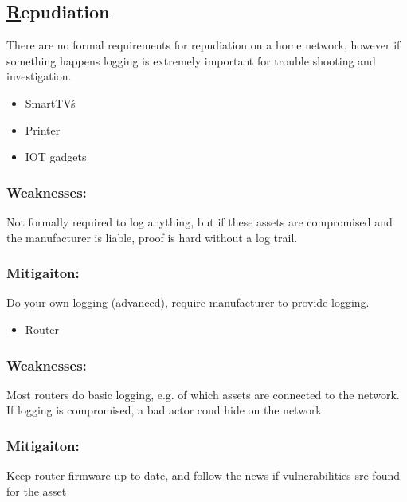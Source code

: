 \documentclass[
	letterpaper, %
	10pt, %
	unnumberedsections, %
	twoside, %
]{APAAssignment}
\begin{document}
\begin{singlespace}
\subsection{\underline{R}epudiation}
There are no formal requirements for repudiation on a home network, however if something happens logging is extremely important for trouble shooting and investigation.  



	\begin{itemize}
		\item SmartTV\'s
		\item Printer 
		\item IOT gadgets 
	\end{itemize}
	
	\subsubsection{Weaknesses:} Not formally required to log anything, but if these assets are compromised and the manufacturer is liable, proof is hard without a log trail. 
	\subsubsection{Mitigaiton:} Do your own logging (advanced), require manufacturer to provide logging.
	
	\begin{itemize}
		\item Router
	\end{itemize}
	
	\subsubsection{Weaknesses:} Most routers do basic logging, e.g. of which assets are connected to the network. If logging is compromised, a bad actor  coud hide on the network
	\subsubsection{Mitigaiton:} Keep router firmware up to date, and follow the news if vulnerabilities sre found for the asset
		
\end{singlespace}
\end{document}
